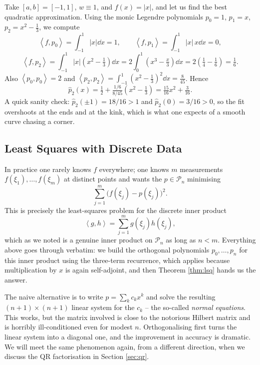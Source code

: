 \documentclass[a4paper]{scrartcl}
\providecommand{\abs}[1]{\left\lvert#1\right\rvert}
\renewcommand{\abs}[1]{\left\lvert#1\right\rvert}
\newcommand{\ip}[2]{\left\langle #1, #2 \right\rangle}
\newcommand{\Pn}[1]{\mathcal{P}_{#1}}
\begin{document}
\begin{example}[Least Squares Fit of $\abs{x}$]
  Take $[a,b] = [-1,1]$, $w \equiv 1$, and $f(x) = \abs{x}$, and let us find the best quadratic approximation. Using the monic Legendre polynomials $p_0 = 1$, $p_1 = x$, $p_2 = x^2 - \tfrac13$, we compute
  $$
  \ip{f}{p_0} = \int_{-1}^1 \abs{x} \dd x = 1, \qquad \ip{f}{p_1} = \int_{-1}^1 \abs{x}\, x \dd x = 0,
  $$
  $$
  \ip{f}{p_2} = \int_{-1}^1 \abs{x}\left(x^2 - \tfrac13\right)\dd x = 2\int_0^1\left(x^3 - \tfrac{x}{3}\right)\dd x = 2\left(\tfrac14 - \tfrac16\right) = \tfrac16 .
  $$
  Also $\ip{p_0}{p_0} = 2$ and $\ip{p_2}{p_2} = \int_{-1}^1 (x^2 - \tfrac13)^2\dd x = \tfrac{8}{45}$. Hence
  $$
  \hat p_2(x) = \tfrac12 + \tfrac{1/6}{8/45}\left(x^2 - \tfrac13\right) = \tfrac{15}{16}x^2 + \tfrac{3}{16}.
  $$
  A quick sanity check: $\hat p_2(\pm 1) = 18/16 > 1$ and $\hat p_2(0) = 3/16 > 0$, so the fit overshoots at the ends and at the kink, which is what one expects of a smooth curve chasing a corner.
\end{example}

\subsection{Least Squares with Discrete Data}

In practice one rarely knows $f$ everywhere; one knows $m$ measurements $f(\xi_1), \dots, f(\xi_m)$ at distinct points and wants the $p \in \Pn{n}$ minimising
$$
\sum_{j=1}^m \big(f(\xi_j) - p(\xi_j)\big)^2 .
$$
This is precisely the least-squares problem for the discrete inner product
$$
\ip{g}{h} = \sum_{j=1}^m g(\xi_j)h(\xi_j),
$$
which as we noted is a genuine inner product on $\Pn{n}$ as long as $n < m$. Everything above goes through verbatim: we build the orthogonal polynomials $p_0, \dots, p_n$ for this inner product using the three-term recurrence, which applies because multiplication by $x$ is again self-adjoint, and then Theorem \ref{thm:lsq} hands us the answer.

\begin{remark}
  The naive alternative is to write $p = \sum_k c_k x^k$ and solve the resulting $(n+1) \times (n+1)$ linear system for the $c_k$ -- the so-called \emph{normal equations}. This works, but the matrix involved is close to the notorious Hilbert matrix and is horribly ill-conditioned even for modest $n$. Orthogonalising first turns the linear system into a diagonal one, and the improvement in accuracy is dramatic. We will meet the same phenomenon again, from a different direction, when we discuss the QR factorisation in Section \ref{sec:qr}.
\end{remark}
\end{document}
